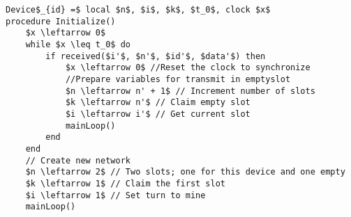 \begin{minipage}{\linewidth} %
\begin{lstlisting}[label=lst:setupCCRC,style=pseudocode,mathescape=true,caption={Pseudocode example of the special case procedure Initialize()},basicstyle=\ttfamily]
Device$_{id} =$ local $n$, $i$, $k$, $t_0$, clock $x$
procedure Initialize()
    $x \leftarrow 0$
    while $x \leq t_0$ do
        if received($i'$, $n'$, $id'$, $data'$) then
            $x \leftarrow 0$ //Reset the clock to synchronize
            //Prepare variables for transmit in emptyslot
            $n \leftarrow n' + 1$ // Increment number of slots
            $k \leftarrow n'$ // Claim empty slot
            $i \leftarrow i'$ // Get current slot
            mainLoop()
        end
    end
    // Create new network
    $n \leftarrow 2$ // Two slots; one for this device and one empty
    $k \leftarrow 1$ // Claim the first slot
    $i \leftarrow 1$ // Set turn to mine
    mainLoop()
\end{lstlisting}   
\end{minipage}
